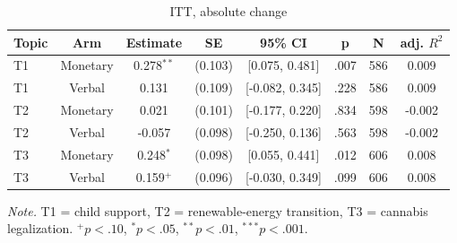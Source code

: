 \begin{table}[htbp]
\centering
\begin{threeparttable}
\caption{ITT, absolute change}
\label{tab:tab_itt_absolute}
\begin{tabular}{lccccccc}
\toprule
  Topic & Arm & Estimate & SE & 95\% CI & p & N & adj. $R^2$ \\
\midrule
  T1 & Monetary & 0.278$^{**}$ & (0.103) & [0.075, 0.481] & .007 & 586 & 0.009 \\
  T1 & Verbal & 0.131 & (0.109) & [-0.082, 0.345] & .228 & 586 & 0.009 \\
  T2 & Monetary & 0.021 & (0.101) & [-0.177, 0.220] & .834 & 598 & -0.002 \\
  T2 & Verbal & -0.057 & (0.098) & [-0.250, 0.136] & .563 & 598 & -0.002 \\
  T3 & Monetary & 0.248$^{*}$ & (0.098) & [0.055, 0.441] & .012 & 606 & 0.008 \\
  T3 & Verbal & 0.159$^{+}$ & (0.096) & [-0.030, 0.349] & .099 & 606 & 0.008 \\
\bottomrule
\end{tabular}
\begin{tablenotes}\footnotesize\item \textit{Note.} T1 = child support, T2 = renewable-energy transition, T3 = cannabis legalization. $^{+}p<.10$, $^{*}p<.05$, $^{**}p<.01$, $^{***}p<.001$.\end{tablenotes}
\end{threeparttable}
\end{table}
